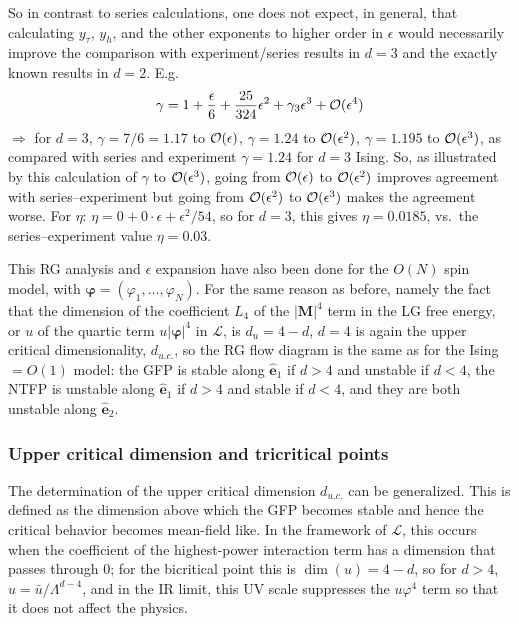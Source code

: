 So in contrast to series calculations, one does not expect, in general, that calculating $y_\tau$, $y_h$, and the
other exponents to higher order in $\epsilon$ would necessarily improve the comparison with experiment/series
results in $d = 3$ and the exactly known results in $d = 2$. E.g.
\begin{equation}
  \gamma = 1+\frac{\epsilon}{6}+\frac{25}{324}\epsilon^2+\gamma_3\epsilon^3+\mathcal{O}(\epsilon^4)
\end{equation}
$\Rightarrow$ for $d = 3$, $\gamma = 7/6 = 1.17$ to $\mathcal{O}(\epsilon)$, $\gamma = 1.24$ to $\mathcal{O}(\epsilon^2)$,
$\gamma = 1.195$ to $\mathcal{O}(\epsilon^3)$, as compared with series and experiment $\gamma = 1.24$ for $d = 3$ Ising.
So, as illustrated by this calculation of $\gamma$ to $\mathcal{O}(\epsilon^3)$, going from $\mathcal{O}(\epsilon)$ to
$\mathcal{O}(\epsilon^2)$ improves agreement with series--experiment but going from $\mathcal{O}(\epsilon^2)$ to
$\mathcal{O}(\epsilon^3)$ makes the agreement worse. For $\eta$: $\eta = 0+0\cdot\epsilon+\epsilon^2/54$, so for
$d = 3$, this gives $\eta = 0.0185$, vs.\ the series--experiment value $\eta = 0.03$.

This RG analysis and $\epsilon$ expansion have also been done for the $O(N)$ spin model, with
$\boldsymbol\varphi = (\varphi_1,\ldots,\varphi_N)$. For the same reason as before, namely the fact that the
dimension of the coefficient $L_4$ of the $|\mathbf M|^4$ term in the LG free energy, or $u$ of the quartic term
$u|\boldsymbol\varphi|^4$ in $\mathcal L$, is $d_u = 4-d$, $d = 4$ is again the upper critical dimensionality,
$d_{u.c.}$, so the RG flow diagram is the same as for the Ising $= O(1)$ model: the GFP is stable along
$\hat{\mathbf e}_1$ if $d>4$ and unstable if $d<4$, the NTFP is unstable along $\hat{\mathbf e}_1$ if $d>4$ and
stable if $d<4$, and they are both unstable along $\hat{\mathbf e}_2$.

\subsubsection*{Upper critical dimension and tricritical points}

The determination of the upper critical dimension $d_{u.c.}$ can be generalized. This is defined as the dimension
above which the GFP becomes stable and hence the critical behavior becomes mean-field like. In the framework of
$\mathcal L$, this occurs when the coefficient of the highest-power interaction term has a dimension that passes
through 0; for the bicritical point this is $\dim(u) = 4-d$, so for $d>4$, $u = \bar u/\Lambda^{d-4}$, and in the
IR limit, this UV scale suppresses the $u\varphi^4$ term so that it does not affect the physics.

